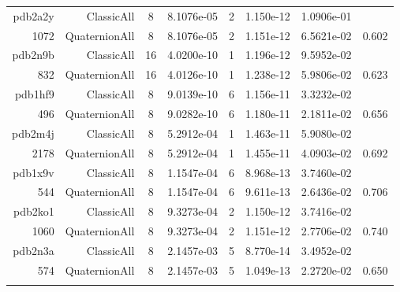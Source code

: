 \begin{xltabular}{\textwidth}{r|rcS[table-format=1.4e+2]cS[table-format=1.3e+2]S[table-format=1.4e+2]S[table-format=-1.3]}
pdb2a2y & ClassicAll & 8 & 8.1076e-05 & 2 & 1.150e-12 & 1.0906e-01 & \\
1072 & QuaternionAll & 8 & 8.1076e-05 & 2 & 1.151e-12 & 6.5621e-02 & 0.602\\  \addlinespace
pdb2n9b & ClassicAll & 16 & 4.0200e-10 & 1 & 1.196e-12 & 9.5952e-02 & \\
832 & QuaternionAll & 16 & 4.0126e-10 & 1 & 1.238e-12 & 5.9806e-02 & 0.623\\  \addlinespace
pdb1hf9 & ClassicAll & 8 & 9.0139e-10 & 6 & 1.156e-11 & 3.3232e-02 & \\
496 & QuaternionAll & 8 & 9.0282e-10 & 6 & 1.180e-11 & 2.1811e-02 & 0.656\\  \addlinespace
pdb2m4j & ClassicAll & 8 & 5.2912e-04 & 1 & 1.463e-11 & 5.9080e-02 & \\
2178 & QuaternionAll & 8 & 5.2912e-04 & 1 & 1.455e-11 & 4.0903e-02 & 0.692\\  \addlinespace
pdb1x9v & ClassicAll & 8 & 1.1547e-04 & 6 & 8.968e-13 & 3.7460e-02 & \\
544 & QuaternionAll & 8 & 1.1547e-04 & 6 & 9.611e-13 & 2.6436e-02 & 0.706\\  \addlinespace
pdb2ko1 & ClassicAll & 8 & 9.3273e-04 & 2 & 1.150e-12 & 3.7416e-02 & \\
1060 & QuaternionAll & 8 & 9.3273e-04 & 2 & 1.151e-12 & 2.7706e-02 & 0.740\\  \addlinespace
pdb2n3a & ClassicAll & 8 & 2.1457e-03 & 5 & 8.770e-14 & 3.4952e-02 & \\
574 & QuaternionAll & 8 & 2.1457e-03 & 5 & 1.049e-13 & 2.2720e-02 & 0.650\\  \addlinespace
\end{xltabular}
